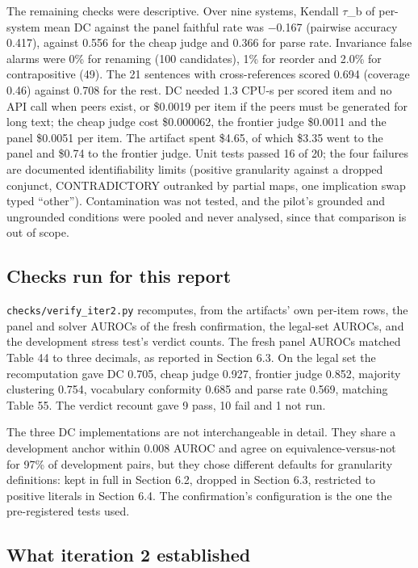 \documentclass[11pt,letterpaper]{article}
\begin{document}
The remaining checks were descriptive. Over nine systems, Kendall $\tau$\_\allowbreak{}b of per-system mean DC against the panel faithful rate was $-$0.167 (pairwise accuracy 0.417), against 0.556 for the cheap judge and 0.366 for parse rate. Invariance false alarms were 0\% for renaming (100 candidates), 1\% for reorder and 2.0\% for contrapositive (49). The 21 sentences with cross-references scored 0.694 (coverage 0.46) against 0.708 for the rest. DC needed 1.3 CPU-s per scored item and no API call when peers exist, or \$0.0019 per item if the peers must be generated for long text; the cheap judge cost \$0.000062, the frontier judge \$0.0011 and the panel \$0.0051 per item. The artifact spent \$4.65, of which \$3.35 went to the panel and \$0.74 to the frontier judge. Unit tests passed 16 of 20; the four failures are documented identifiability limits (positive granularity against a dropped conjunct, CONTRADICTORY outranked by partial maps, one implication swap typed ``other''). Contamination was not tested, and the pilot's grounded and ungrounded conditions were pooled and never analysed, since that comparison is out of scope.

\subsection{Checks run for this report}

\texttt{checks/\allowbreak{}verify\_\allowbreak{}\allowbreak{}iter2.py} recomputes, from the artifacts' own per-item rows, the panel and solver AUROCs of the fresh confirmation, the legal-set AUROCs, and the development stress test's verdict counts. The fresh panel AUROCs matched Table 44 to three decimals, as reported in Section 6.3. On the legal set the recomputation gave DC 0.705, cheap judge 0.927, frontier judge 0.852, majority clustering 0.754, vocabulary conformity 0.685 and parse rate 0.569, matching Table 55. The verdict recount gave 9 pass, 10 fail and 1 not run.

The three DC implementations are not interchangeable in detail. They share a development anchor within 0.008 AUROC and agree on equivalence-versus-not for 97\% of development pairs, but they chose different defaults for granularity definitions: kept in full in Section 6.2, dropped in Section 6.3, restricted to positive literals in Section 6.4. The confirmation's configuration is the one the pre-registered tests used.

\subsection{What iteration 2 established}
\end{document}
